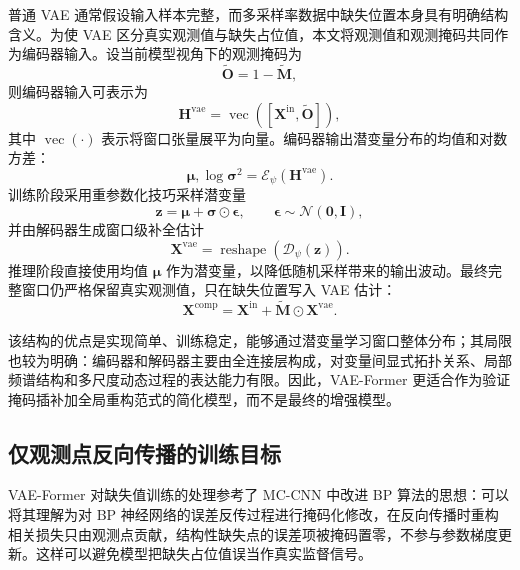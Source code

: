 \documentclass[bachelor, vlined]{DissertUESTC}
\begin{document}
    普通 VAE 通常假设输入样本完整，而多采样率数据中缺失位置本身具有明确结构含义。为使 VAE 区分真实观测值与缺失占位值，本文将观测值和观测掩码共同作为编码器输入。设当前模型视角下的观测掩码为
    \begin{equation}
        \widetilde{\mathbf{O}} = 1-\widetilde{\mathbf{M}},
    \end{equation}
    则编码器输入可表示为
    \begin{equation}
        \mathbf{H}^{\mathrm{vae}} = \operatorname{vec}\!\left([\mathbf{X}^{\mathrm{in}},\widetilde{\mathbf{O}}]\right),
    \end{equation}
    其中 $\operatorname{vec}(\cdot)$ 表示将窗口张量展平为向量。编码器输出潜变量分布的均值和对数方差：
    \begin{equation}
        \boldsymbol{\mu},\log\boldsymbol{\sigma}^{2}
        =
        \mathcal{E}_{\psi}\!\left(\mathbf{H}^{\mathrm{vae}}\right).
    \end{equation}
    训练阶段采用重参数化技巧采样潜变量
    \begin{equation}
        \mathbf{z} = \boldsymbol{\mu} + \boldsymbol{\sigma}\odot\boldsymbol{\epsilon},
        \qquad
        \boldsymbol{\epsilon}\sim \mathcal{N}(\mathbf{0},\mathbf{I}),
    \end{equation}
    并由解码器生成窗口级补全估计
    \begin{equation}
        \mathbf{X}^{\mathrm{vae}} = \operatorname{reshape}\!\left(\mathcal{D}_{\psi}(\mathbf{z})\right).
    \end{equation}
    推理阶段直接使用均值 $\boldsymbol{\mu}$ 作为潜变量，以降低随机采样带来的输出波动。最终完整窗口仍严格保留真实观测值，只在缺失位置写入 VAE 估计：
    \begin{equation}
        \mathbf{X}^{\mathrm{comp}}
        =
        \mathbf{X}^{\mathrm{in}}
        +
        \widetilde{\mathbf{M}} \odot \mathbf{X}^{\mathrm{vae}}.
    \end{equation}

    该结构的优点是实现简单、训练稳定，能够通过潜变量学习窗口整体分布；其局限也较为明确：编码器和解码器主要由全连接层构成，对变量间显式拓扑关系、局部频谱结构和多尺度动态过程的表达能力有限。因此，VAE-Former 更适合作为验证掩码插补加全局重构范式的简化模型，而不是最终的增强模型。

    \subsection{仅观测点反向传播的训练目标}

    VAE-Former 对缺失值训练的处理参考了 MC-CNN 中改进 BP 算法的思想：可以将其理解为对 BP 神经网络的误差反传过程进行掩码化修改，在反向传播时重构相关损失只由观测点贡献，结构性缺失点的误差项被掩码置零，不参与参数梯度更新。这样可以避免模型把缺失占位值误当作真实监督信号。
\end{document}

